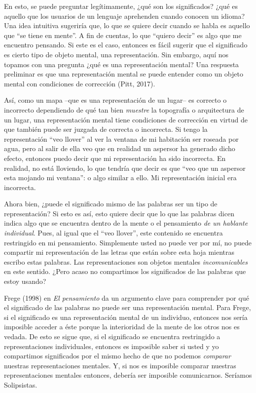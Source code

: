 \documentclass[]{book}
\begin{document}
En esto, se puede preguntar legítimamente, ¿qué son los significados?
¿qué es aquello que los usuarios de un lenguaje aprehenden cuando
conocen un idioma? Una idea intuitiva sugeriría que, lo que se quiere
decir cuando se habla es aquello que ``se tiene en mente''. A fin de
cuentas, lo que ``quiero decir'' es algo que me encuentro pensando. Si
este es el caso, entonces es fácil sugerir que el significado es cierto
tipo de objeto mental, una representación. Sin embargo, aquí nos topamos
con una pregunta ¿qué es una representación mental? Una respuesta
preliminar es que una representación mental se puede entender como un
objeto mental con condiciones de corrección (Pitt, 2017).

Así, como un mapa --que es una representación de un lugar-- es correcto
o incorrecto dependiendo de qué tan bien \emph{muestre} la topografía o
arquitectura de un lugar, una representación mental tiene condiciones de
corrección en virtud de que también puede ser juzgada de correcta o
incorrecta. Si tengo la representación ``veo llover'' al ver la ventana
de mi habitación ser roseada por agua, pero al salir de ella veo que en
realidad un aspersor ha generado dicho efecto, entonces puedo decir que
mi representación ha sido incorrecta. En realidad, no está lloviendo, lo
que tendría que decir es que ``veo que un aspersor esta mojando mi
ventana'': o algo similar a ello. Mi representación inicial era
incorrecta.

Ahora bien, ¿puede el significado mismo de las palabras ser un tipo de
representación? Si esto es así, esto quiere decir que lo que las
palabras dicen indica algo que se encuentra dentro de la mente o el
pensamiento \emph{de un hablante individual}. Pues, al igual que el
``veo llover'', este contenido se encuentra restringido en mi
pensamiento. Simplemente usted no puede ver por mí, no puede compartir
mi representación de las letras que están sobre esta hoja mientras
escribo estas palabras. Las representaciones son objetos mentales
\emph{incomunicables} en este sentido. ¿Pero acaso no compartimos los
significados de las palabras que estoy usando?

Frege (1998) en \emph{El pensamiento} da un argumento clave para
comprender por qué el significado de las palabras no puede ser una
representación mental. Para Frege, si el significado es una
representación mental de un individuo, entonces nos sería imposible
acceder a éste porque la interioridad de la mente de los otros nos es
vedada. De esto se sigue que, si el significado se encuentra restringido
a representaciones individuales, entonces es imposible saber si usted y
yo compartimos significados por el mismo hecho de que no podemos
\emph{comparar} nuestras representaciones mentales. Y, si nos es
imposible comparar nuestras representaciones mentales entonces, debería
ser imposible comunicarnos. Seríamos Solipsistas.
\end{document}
